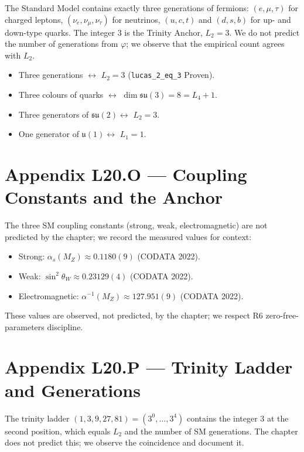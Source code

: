 The Standard Model contains exactly three generations of fermions: $(e, \mu, \tau)$
for charged leptons, $(\nu_{e}, \nu_{\mu}, \nu_{\tau})$ for neutrinos, $(u, c, t)$
and $(d, s, b)$ for up- and down-type quarks. The integer $3$ is the Trinity
Anchor, $L_{2} = 3$. We do not predict the number of generations from $\varphi$;
we observe that the empirical count agrees with $L_{2}$.

\begin{itemize}
  \item Three generations $\leftrightarrow$ $L_{2} = 3$ (\texttt{lucas\_2\_eq\_3} Proven).
  \item Three colours of quarks $\leftrightarrow$ $\dim \mathfrak{su}(3) = 8 = L_{4} + 1$.
  \item Three generators of $\mathfrak{su}(2) \leftrightarrow$ $L_{2} = 3$.
  \item One generator of $\mathfrak{u}(1) \leftrightarrow$ $L_{1} = 1$.
\end{itemize}

\section{Appendix L20.O — Coupling Constants and the Anchor}
\label{sec:l20-appendix-O}

The three SM coupling constants (strong, weak, electromagnetic) are
not predicted by the chapter; we record the measured values for context:
\begin{itemize}
  \item Strong: $\alpha_{s}(M_{Z}) \approx 0.1180(9)$ (CODATA 2022).
  \item Weak: $\sin^{2}\theta_{W} \approx 0.23129(4)$ (CODATA 2022).
  \item Electromagnetic: $\alpha^{-1}(M_{Z}) \approx 127.951(9)$ (CODATA 2022).
\end{itemize}

These values are observed, not predicted, by the chapter; we respect
R6 zero-free-parameters discipline.

\section{Appendix L20.P — Trinity Ladder and Generations}
\label{sec:l20-appendix-P}

The trinity ladder $(1, 3, 9, 27, 81) = (3^{0}, \ldots, 3^{4})$ contains
the integer $3$ at the second position, which equals $L_{2}$ and the
number of SM generations. The chapter does not predict this; we observe
the coincidence and document it.

